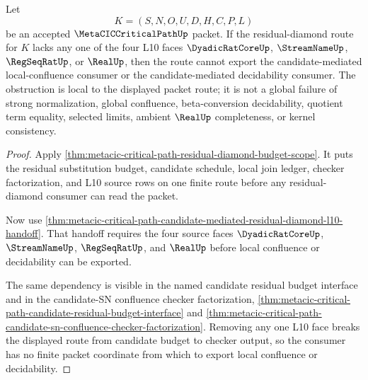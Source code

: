 \begin{theorem}
\label{thm:metacic-critical-path-residual-diamond-l10-locality-obstruction}
Let
$$
K=(S,N,O,U,D,H,C,P,L)
$$
be an accepted $\MetaCICCriticalPathUp$ packet. If the residual-diamond route for $K$ lacks any one of the four L10 faces $\DyadicRatCoreUp$, $\StreamNameUp$, $\RegSeqRatUp$, or $\RealUp$, then the route cannot export the candidate-mediated local-confluence consumer or the candidate-mediated decidability consumer. The obstruction is local to the displayed packet route; it is not a global failure of strong normalization, global confluence, beta-conversion decidability, quotient term equality, selected limits, ambient $\RealUp$ completeness, or kernel consistency.
\end{theorem}
\begin{proof}
Apply \autoref{thm:metacic-critical-path-residual-diamond-budget-scope}. It puts the residual substitution budget, candidate schedule, local join ledger, checker factorization, and L10 source rows on one finite route before any residual-diamond consumer can read the packet.

Now use \autoref{thm:metacic-critical-path-candidate-mediated-residual-diamond-l10-handoff}. That handoff requires the four source faces $\DyadicRatCoreUp$, $\StreamNameUp$, $\RegSeqRatUp$, and $\RealUp$ before local confluence or decidability can be exported.

The same dependency is visible in the named candidate residual budget interface and in the candidate-SN confluence checker factorization, \autoref{thm:metacic-critical-path-candidate-residual-budget-interface} and \autoref{thm:metacic-critical-path-candidate-sn-confluence-checker-factorization}. Removing any one L10 face breaks the displayed route from candidate budget to checker output, so the consumer has no finite packet coordinate from which to export local confluence or decidability.
\end{proof}

